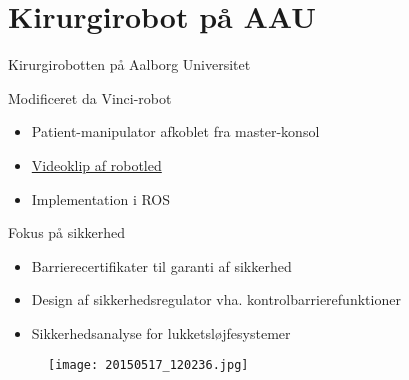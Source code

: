\section{Kirurgirobot på AAU}
\begin{frame}{Kirurgirobotten på Aalborg Universitet}
\begin{minipage}[b]{0.55\linewidth}
	\vspace{2mm}
\begin{block}{Modificeret da Vinci-robot}
	\begin{itemize}
		\item Patient-manipulator afkoblet fra master-konsol 
		\item \href{file:video/davinci_joints.mp4}{Videoklip af robotled}
		\item Implementation i ROS
	\end{itemize}
\end{block}
\vspace{-1mm}
\begin{block}{Fokus på sikkerhed}
	\begin{itemize}
		\item Barrierecertifikater til garanti af sikkerhed
		\item Design af sikkerhedsregulator vha. kontrolbarrierefunktioner
		\item Sikkerhedsanalyse for lukketsløjfesystemer
	\end{itemize}
\end{block}
\end{minipage}
\hspace{0.1cm}
\begin{minipage}[b]{0.4\linewidth}
	\begin{figure}[h]
		\centering
		\texttt{[image: 20150517\_120236.jpg]}
	\end{figure}
\end{minipage}
\vspace{1cm}
\end{frame}

